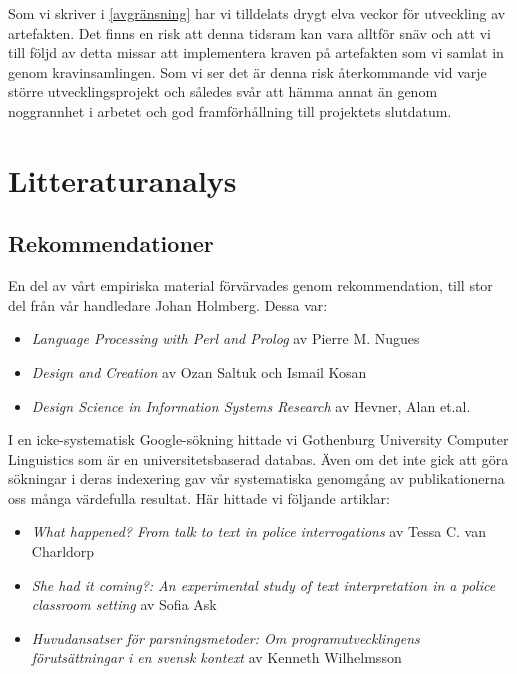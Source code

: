 \documentclass[swedish]{maucsthesis}
\begin{document}
Som vi skriver i \cref{avgränsning} har vi tilldelats drygt elva veckor
för utveckling av artefakten. Det finns en risk att denna tidsram kan vara
alltför snäv och att vi till följd av detta missar att implementera kraven på
artefakten som vi samlat in genom kravinsamlingen. Som vi ser det är denna risk
återkommande vid varje större utvecklingsprojekt och således svår att hämma
annat än genom noggrannhet i arbetet och god framförhållning till projektets
slutdatum.

\section{Litteraturanalys}\label{litteraturstudie}

\subsection{Rekommendationer}

En del av vårt empiriska material förvärvades genom rekommendation, till stor del från vår
handledare Johan Holmberg. Dessa var:
\begin{itemize}
\item \textit{Language Processing with Perl and Prolog} av Pierre M. Nugues
\item \textit{Design and Creation} av Ozan Saltuk och Ismail Kosan
\item \textit{Design Science in Information Systems Research} av Hevner, Alan et.al.
\end{itemize}

I en icke-systematisk Google-sökning hittade vi Gothenburg University Computer
Linguistics som är en universitetsbaserad databas. Även om det inte gick att
göra sökningar i deras indexering gav vår systematiska genomgång av
publikationerna oss många värdefulla resultat. Här hittade vi följande artiklar:

\begin{itemize}
\item \textit{What happened? From talk to text in police interrogations} av
  Tessa C. van Charldorp
\item \textit{She had it coming?: An experimental study of text interpretation
    in a police classroom setting} av Sofia Ask
\item \textit{Huvudansatser för parsningsmetoder: Om programutvecklingens
    förutsättningar i en svensk kontext} av Kenneth Wilhelmsson
\end{itemize}
\end{document}
